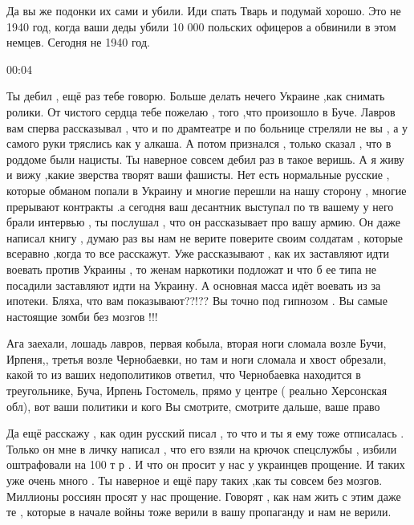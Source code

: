 {Да вы же подонки их сами и убили.  Иди спать Тварь и подумай хорошо. Это не
1940 год, когда ваши деды убили 10 000 польских офицеров а обвинили в этом
немцев. Сегодня не 1940 год.

00:04

Ты дебил , ещё раз тебе говорю. Больше делать нечего Украине ,как снимать
ролики. От чистого сердца тебе пожелаю , того ,что произошло в Буче. Лавров вам
сперва рассказывал , что и по драмтеатре и по больнице стреляли не вы , а у
самого руки тряслись как у алкаша. А потом признался , только сказал , что в
роддоме были нацисты. Ты наверное совсем дебил раз в такое веришь. А я живу и
вижу ,какие зверства творят ваши фашисты. Нет есть нормальные русские , которые
обманом попали в Украину и многие перешли на нашу сторону , многие прерывают
контракты .а сегодня ваш десантник выступал по тв вашему у него брали интервью
, ты послушал , что он рассказывает про вашу армию. Он даже написал книгу ,
думаю раз вы нам не верите поверите своим солдатам , которые всеравно ,когда то
все расскажут. Уже рассказывают , как их заставляют идти воевать против Украины
, то женам наркотики подложат и что б ее типа не посадили заставляют идти на
Украину. А основная масса идёт воевать из за ипотеки. Бляха, что вам
показывают??!?? Вы точно под гипнозом . Вы самые настоящие зомби без мозгов !!!


Ага заехали, лошадь лавров, первая кобыла, вторая ноги сломала возле Бучи,
Ирпеня,, третья возле Чернобаевки, но там и ноги сломала и хвост обрезали,
какой то из ваших недополитиков ответил, что Чернобаевка находится в
треугольнике, Буча, Ирпень Гостомель, прямо у центре ( реально Херсонская обл),
вот ваши политики и кого Вы смотрите, смотрите дальше, ваше право


Да ещё расскажу , как один русский писал , то что и ты я ему тоже отписалась .
Только он мне в личку написал , что его взяли на крючок спецслужбы , избили
оштрафовали на 100 т р . И что он просит у нас у украинцев прощение. И таких
уже очень много . Ты наверное и ещё пару таких ,как ты совсем без мозгов.
Миллионы россиян просят у нас прощение. Говорят , как нам жить с этим даже те ,
которые в начале войны тоже верили в вашу пропаганду и нам не верили.


}
